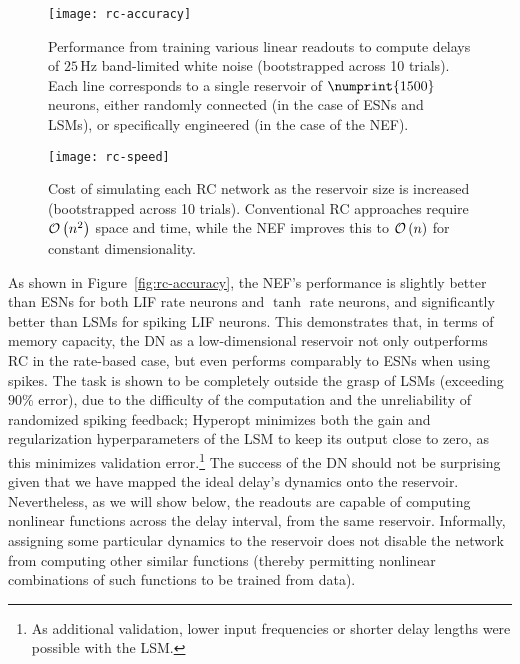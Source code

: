 \begin{figure}
  \centering
  \texttt{[image: rc-accuracy]}
  \caption[Accuracy of Reservoir Computing versus the NEF.]{ \label{fig:rc-accuracy}
  Performance from training various linear readouts to compute delays of $25$\,Hz band-limited white noise (bootstrapped across 10 trials).
  Each line corresponds to a single reservoir of $\numprint{1500}$ neurons, either randomly connected (in the case of ESNs and LSMs), or specifically engineered (in the case of the NEF).
  }

  \vspace{1em}

  \centering
  \texttt{[image: rc-speed]}
  \caption[Efficiency of Reservoir Computing versus the NEF.]{ \label{fig:rc-speed}
  Cost of simulating each RC network as the reservoir size is increased (bootstrapped across 10 trials).
  Conventional RC approaches require $\mathcal{O}\left({ n^2 }\right)$ space and time, while the NEF improves this to $\mathcal{O}\left({ n }\right)$ for constant dimensionality.
  }
\end{figure}

As shown in Figure~\ref{fig:rc-accuracy}, the NEF's performance is slightly better than ESNs for both LIF rate neurons and $\tanh$ rate neurons, and significantly better than LSMs for spiking LIF neurons.
This demonstrates that, in terms of memory capacity, the DN as a low-dimensional reservoir not only outperforms RC in the rate-based case, but even performs comparably to ESNs when using spikes.
The task is shown to be completely outside the grasp of LSMs (exceeding $90$\% error), due to the difficulty of the computation and the unreliability of randomized spiking feedback; Hyperopt minimizes both the gain and regularization hyperparameters of the LSM to keep its output close to zero, as this minimizes validation error.\footnote{%
As additional validation, lower input frequencies or shorter delay lengths were possible with the LSM.}
The success of the DN should not be surprising given that we have mapped the ideal delay's dynamics onto the reservoir.
Nevertheless, as we will show below, the readouts are capable of computing nonlinear functions across the delay interval, from the same reservoir.
Informally, assigning some particular dynamics to the reservoir does not disable the network from computing other similar functions (thereby permitting nonlinear combinations of such functions to be trained from data).

